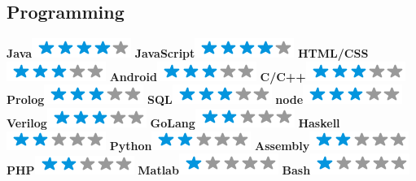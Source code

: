 \documentclass[]{friggeri-cv}
\begin{document}
\begin{aside}
  \section{Programming}
   \textbf{Java}\includegraphics[scale=0.40]{img/4stars.png}
   \textbf{JavaScript}\includegraphics[scale=0.40]{img/4stars.png}
   \textbf{HTML/CSS}\includegraphics[scale=0.40]{img/3stars.png}
   \textbf{Android}\includegraphics[scale=0.40]{img/3stars.png}
   \textbf{C/C++}\includegraphics[scale=0.40]{img/3stars.png}
   \textbf{Prolog}\includegraphics[scale=0.40]{img/3stars.png}   
   \textbf{SQL}\includegraphics[scale=0.40]{img/3stars.png}
   \textbf{node}\includegraphics[scale=0.40]{img/3stars.png}
   \textbf{Verilog}\includegraphics[scale=0.40]{img/3stars.png}
   \textbf{GoLang}\includegraphics[scale=0.40]{img/2stars.png}
   \textbf{Haskell}\includegraphics[scale=0.40]{img/2stars.png}
   \textbf{Python}\includegraphics[scale=0.40]{img/2stars.png}
   \textbf{Assembly}\includegraphics[scale=0.40]{img/2stars.png}
   \textbf{PHP}\includegraphics[scale=0.40]{img/2stars.png}
   \textbf{Matlab}\includegraphics[scale=0.40]{img/1stars.png}
   \textbf{Bash}\includegraphics[scale=0.40]{img/1stars.png}
    ~

\end{aside}
\end{document}
